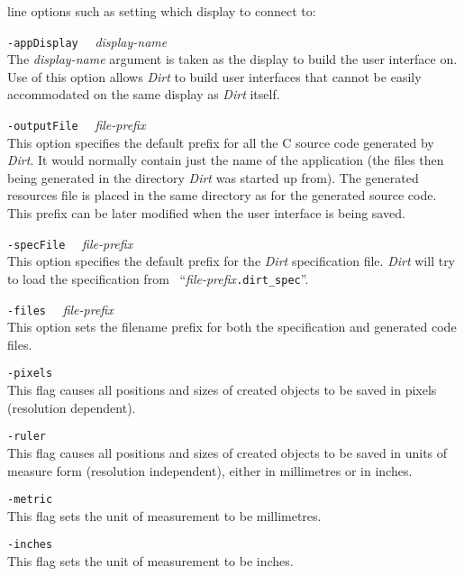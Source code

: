 line options such as setting which display to connect to:\begin{description}
\item{{\tt -appDisplay} ~~\em display-name} \\
The {\em display-name} argument is taken as the display to build the user
interface on.  Use of this option allows {\em Dirt} to build user interfaces
that cannot be easily accommodated on the same display as {\em Dirt}
itself.

\item{{\tt -outputFile} ~~\em file-prefix} \\
This option specifies the default prefix for all the C source code generated by
{\em Dirt}.  It would normally contain just the name of the application
(the files then being generated in the directory {\em Dirt} was started up
from).  The generated resources file is placed in the same directory as for the
generated source code.  This prefix can be later modified when the user
interface is being saved.

\item{{\tt -specFile} ~~\em file-prefix} \\
This option specifies the default prefix for the {\em Dirt} specification file.
{\em Dirt} will try to load the specification from
~``{\em file-prefix}{\tt .dirt\_spec}''.

\item{{\tt -files} ~~\em file-prefix} \\
This option sets the filename prefix for both the specification and generated
code files.

\item{\tt -pixels} \\
This flag causes all positions and sizes of created objects to be saved in
pixels (resolution dependent).

\item{\tt -ruler} \\
This flag causes all positions and sizes of created objects to be saved in
units of measure form (resolution independent), either in millimetres or in
inches.

\item{\tt -metric} \\
This flag sets the unit of measurement to be millimetres.

\item{\tt -inches} \\
This flag sets the unit of measurement to be inches.


\end{description}
